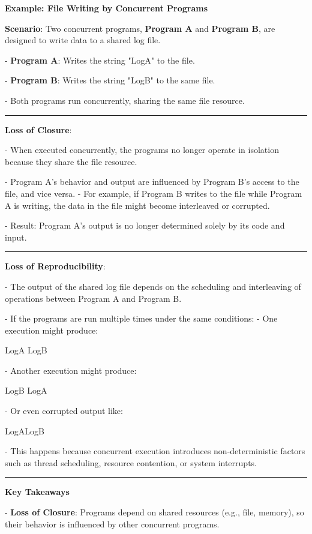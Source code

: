 \documentclass[a4paper]{book}
\begin{document}
\textbf{Example: File Writing by Concurrent Programs}

\textbf{Scenario}:  
Two concurrent programs, \textbf{Program A} and \textbf{Program B}, are designed to write data to a shared log file.

- \textbf{Program A}: Writes the string "LogA" to the file.  

- \textbf{Program B}: Writes the string "LogB" to the same file.  

- Both programs run concurrently, sharing the same file resource.

\rule{0.75\textwidth}{0.5pt}

\textbf{Loss of Closure}:

- When executed concurrently, the programs no longer operate in isolation because they share the file resource.  

- Program A's behavior and output are influenced by Program B's access to the file, and vice versa.    - For example, if Program B writes to the file while Program A is writing, the data in the file might become interleaved or corrupted.
    
    - Result: Program A's output is no longer determined solely by its code and input.

\rule{0.75\textwidth}{0.5pt}

\textbf{Loss of Reproducibility}:

- The output of the shared log file depends on the scheduling and interleaving of operations between Program A and Program B.  

- If the programs are run multiple times under the same conditions:    - One execution might produce:

      LogA
      LogB
    
    - Another execution might produce:

      LogB
      LogA
   
    - Or even corrupted output like:

      LogALogB


- This happens because concurrent execution introduces non-deterministic factors such as thread scheduling, resource contention, or system interrupts.

\rule{0.75\textwidth}{0.5pt}

\textbf{Key Takeaways}

- \textbf{Loss of Closure}: Programs depend on shared resources (e.g., file, memory), so their behavior is influenced by other concurrent programs.
\end{document}
